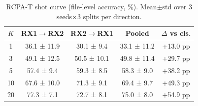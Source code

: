 \begin{table}[t]
\caption{RCPA-T shot curve (file-level accuracy, \%). Mean$\pm$std over 3 seeds$\times$3 splits per direction.}
\label{tab:rcpa}
\centering
\begin{tabular}{ccccc}
\toprule
$K$ & RX1$\rightarrow$RX2 & RX2$\rightarrow$RX1 & Pooled & $\Delta$ vs cls. \\
\midrule
1 & 36.1 ± 11.9 & 30.1 ± 9.4 & 33.1 ± 11.2 & +13.0 pp \\
3 & 49.1 ± 12.5 & 50.5 ± 10.1 & 49.8 ± 11.4 & +29.7 pp \\
5 & 57.4 ± 9.4 & 59.3 ± 8.5 & 58.3 ± 9.0 & +38.2 pp \\
10 & 67.6 ± 10.0 & 71.3 ± 9.1 & 69.4 ± 9.7 & +49.3 pp \\
20 & 77.3 ± 7.1 & 72.7 ± 8.1 & 75.0 ± 8.0 & +54.9 pp \\
\bottomrule
\end{tabular}
\end{table}